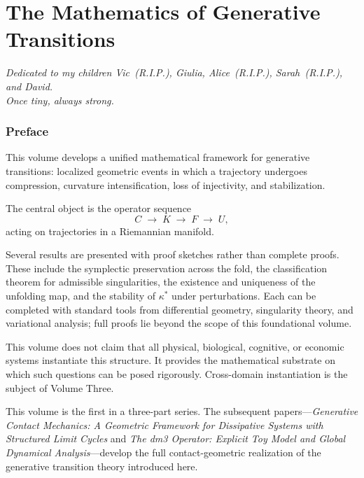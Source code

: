 \documentclass[12pt, oneside]{book}
\theoremstyle{plain}
\theoremstyle{definition}
\theoremstyle{remark}
\begin{document}
\part{The Mathematics of Generative Transitions}

\begin{center}
\emph{Dedicated to my children Vic~(R.I.P.), Giulia,
  Alice~(R.I.P.), Sarah~(R.I.P.), and David.}\\[4pt]
\emph{Once tiny, always strong.}
\end{center}

\vspace{1.5em}

\newpage

\section*{Preface}

This volume develops a unified mathematical framework for generative
transitions: localized geometric events in which a trajectory undergoes
compression, curvature intensification, loss of injectivity, and
stabilization.

The central object is the operator sequence
\[
C \;\rightarrow\; K \;\rightarrow\; F \;\rightarrow\; U,
\]
acting on trajectories in a Riemannian manifold.

Several results are presented with proof sketches rather than complete
proofs. These include the symplectic preservation across the fold, the
classification theorem for admissible singularities, the existence and
uniqueness of the unfolding map, and the stability of $\kappa^*$ under
perturbations. Each can be completed with standard tools from
differential geometry, singularity theory, and variational analysis;
full proofs lie beyond the scope of this foundational volume.

This volume does not claim that all physical, biological, cognitive,
or economic systems instantiate this structure. It provides the
mathematical substrate on which such questions can be posed rigorously.
Cross-domain instantiation is the subject of Volume Three.

This volume is the first in a three-part series. The subsequent
papers---\emph{Generative Contact Mechanics: A Geometric Framework for
Dissipative Systems with Structured Limit Cycles} and \emph{The dm3
Operator: Explicit Toy Model and Global Dynamical Analysis}---develop
the full contact-geometric realization of the generative transition
theory introduced here.
\end{document}
